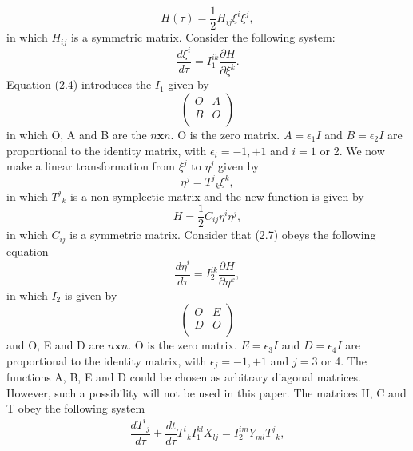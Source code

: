 \begin{equation}
 H({\tau})=\frac{1}{2}H_{ij}{\xi}^i{\xi}^j,
\end{equation}
in which $H_{ij}$ is a symmetric matrix. Consider the following
system:
\begin{equation}
\frac{d{\xi}^i}{d\tau
}=I_{1}^{ik}\frac{\partial{H}}{\partial{\xi}^k } .
\end{equation}
Equation (2.4) introduces the $I_{1}$ given by
\begin{equation}
\left(%
\begin{array}{cc}
  O & A \\
  B & O \\
\end{array}%
\right)
\end{equation}
in which O, A and B are the $n \textbf{x}n$. O is the zero
matrix. $A=\epsilon_{1}I$ and $B=\epsilon_{2}I$ are
proportional to the identity matrix, with $\epsilon_{i}=-1,+1$ and
$i=1$ or 2. We now make a linear transformation from ${\xi}^j$ to
${\eta}^j$ given by
\begin{equation}
  {\eta}^j={{T}^j}_k{\xi}^k,
\end{equation}
in which ${{T}^j}_k$ is a non-symplectic matrix and the new function
is given by
\begin{equation}
 \bar{H}=\frac{1}{2}C_{ij}{\eta}^i{\eta}^j,
\end{equation}
in which $C_{ij}$ is a symmetric matrix. Consider that (2.7) obeys
the following equation
\begin{equation}
\frac{d{\eta}^i}{d\tau
}=I_{2}^{ik}\frac{\partial{H}}{\partial{\eta}^k },
\end{equation}
in which $I_{2}$ is given by
\begin{equation}
\left(%
\begin{array}{cc}
  O & E \\
  D & O \\
\end{array}%
\right)
\end{equation}
and O, E and D are $n \textbf{x}n$. O is the zero matrix.
$E=\epsilon_{3}I$ and $D=\epsilon_{4}I$ are proportional to
the identity matrix, with $\epsilon_{j}=-1,+1$ and $j=3$ or 4.
The functions A, B, E and D could be chosen as arbitrary diagonal
matrices. However, such a possibility will not be used in this
paper. The matrices H, C and T obey the following system
\begin{equation}
 \frac{d{{T}^i}_j}{d\tau}+\frac{d{t}}{d\tau}{{T}^i}_kI_{1}^{kl}X_{lj}=I_{2}^{im}Y_{ml}{{T}^j}_k,
\end{equation}
